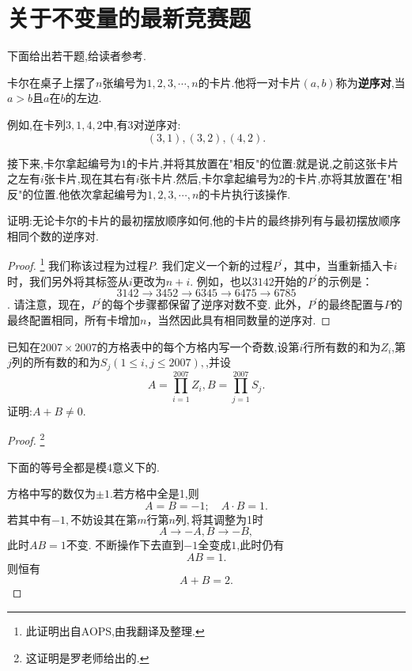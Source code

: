 \section{关于不变量的最新竞赛题}
下面给出若干题,给读者参考.
\begin{problem}
    卡尔在桌子上摆了$n$张编号为$1,2,3,\cdots,n$的卡片.他将一对卡片$(a,b)$称为\textbf{逆序对},当$a>b$且$a$在$b$的左边.

    例如,在卡列$3,1,4,2$中,有3对逆序对:$$(3,1),(3,2),(4,2).$$

    接下来,卡尔拿起编号为$1$的卡片,并将其放置在"相反"的位置:就是说,之前这张卡片之左有$i$张卡片,现在其右有$i$张卡片.然后,卡尔拿起编号为$2$的卡片,亦将其放置在"相反"的位置.他依次拿起编号为$1,2,3,\cdots,n$的卡片执行该操作.

    证明:无论卡尔的卡片的最初摆放顺序如何,他的卡片的最终排列有与最初摆放顺序相同个数的逆序对.
\end{problem}
\begin{proof}\footnote{此证明出自AOPS,由我翻译及整理.}
    我们称该过程为过程$P$.
我们定义一个新的过程$P^{\prime}$，其中，当重新插入卡$i$时，我们另外将其标签从$i$更改为$n + i$. 例如，也以$3142$开始的$P^{\prime}$的示例是：$$3142\to 3452\to 6345\to 6475\to 6785$$. 请注意，现在，$P^{\prime}$的每个步骤都保留了逆序对数不变. 此外，$P^{\prime}$的最终配置与$P$的最终配置相同，所有卡增加$n$，当然因此具有相同数量的逆序对.
\end{proof}
\begin{problem}
    已知在$2007\times2007$的方格表中的每个方格内写一个奇数,设第$i$行所有数的和为$Z_i$,第$j$列的所有数的和为$S_j(1\leq i,j \leq2007),$,并设
    $$A=\prod_{i=1}^{2007}Z_i,B=\prod_{j=1}^{2007}S_j.$$证明:$A+B\neq0.$
\end{problem}
\begin{proof}\footnote{这证明是罗老师给出的.}
    \begin{note}
        下面的等号全都是模4意义下的.
    \end{note}
    方格中写的数仅为$\pm 1$.若方格中全是1,则$$A=B=-1;\quad{A\cdot B=1.}$$
    若其中有$-1,$不妨设其在$\text{第}m\text{行第}n\text{列},$将其调整为1时$$A\to-A,B\to-B,$$此时$AB=1$不变.
    不断操作下去直到$-1$全变成$1$,此时仍有$${\boxed{AB=1.}}$$
    则恒有$$A+B=2.$$
\end{proof}
